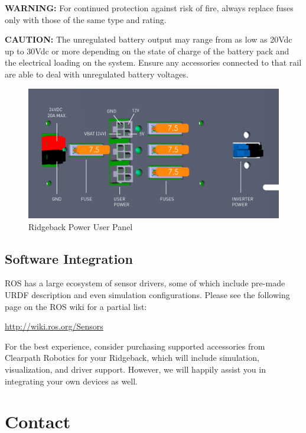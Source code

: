 \documentclass[]{clearpath-latex/clearpath-manual}
\begin{document}
\textbf{WARNING:} For continued protection against risk of fire, always replace fuses only with those of the same type and rating.

\textbf{CAUTION:} The unregulated battery output may range from as low as 20Vdc up to 30Vdc or more depending on the state of charge of the battery pack and the electrical loading on the system. Ensure any accessories connected to that rail are able to deal with unregulated battery voltages.
  


\begin{figure}[h]
  \centering
  \includegraphics[width=1.0\linewidth]{Ridgeback_UserPower_SOLID.pdf}
  \caption{Ridgeback Power User Panel}
  \label{userpower}
\end{figure}





\subsection{Software Integration}

ROS has a large ecosystem of sensor drivers, some of which include pre-made URDF description and even simulation configurations.  Please see the following page on the ROS wiki for a partial list:

\url{http://wiki.ros.org/Sensors }

For the best experience, consider purchasing supported accessories from Clearpath Robotics for your Ridgeback, which will include simulation, visualization, and driver support.  However, we will happily assist you in integrating your own devices as well. 

\section{Contact}
\end{document}

